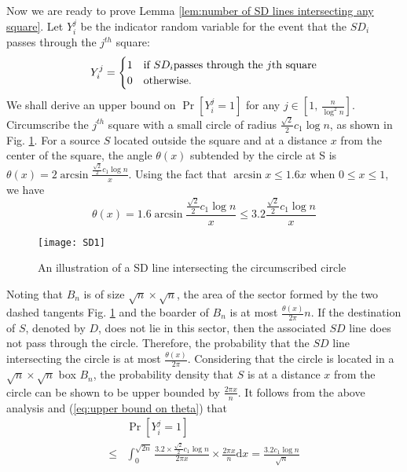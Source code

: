 \documentclass[english]{IEEEtran}
\theoremstyle{plain}
\theoremstyle{plain}
\theoremstyle{plain}
\theoremstyle{remark}
\begin{document}
Now we are ready to prove Lemma \ref{lem:number of SD lines intersecting any square}.
Let $Y_{i}^{j}$ be the indicator random variable for the event that
the $SD_{i}$ passes through the $j^{th}$ square:
\[
Y_{i}^{j}=\begin{cases}
1 & \textrm{if \ensuremath{SD_{i}}passes through the \ensuremath{j}th square}\\
0 & \textrm{otherwise.}
\end{cases}
\]
We shall derive an upper bound on $\Pr\left[Y_{i}^{j}=1\right]$ for
any $j\in\left[1,\,\frac{n}{\log^{2}n}\right]$. Circumscribe the
$j^{th}$ square with a small circle of radius $\frac{\sqrt{2}}{2}c_{1}\log n$,
as shown in Fig. \ref{fig:SD_1}. For a source $S$ located outside
the square and at a distance $x$ from the center of the square, the
angle $\theta\left(x\right)$ subtended by the circle at S is $\theta\left(x\right)=2\arcsin\frac{\frac{\sqrt{2}}{2}c_{1}\log n}{x}$.
Using the fact that $\arcsin x\leq1.6x$ when $0\leq x\leq1$, we
have 
\begin{equation}
\theta\left(x\right)=1.6\arcsin\frac{\frac{\sqrt{2}}{2}c_{1}\log n}{x}\leq3.2\frac{\frac{\sqrt{2}}{2}c_{1}\log n}{x}\label{eq:upper bound on theta}
\end{equation}


\begin{figure}
\begin{centering}
\texttt{[image: SD1]}
\par\end{centering}

\protect\caption{\label{fig:SD_1}An illustration of a SD line intersecting the circumscribed
circle}
\end{figure}


Noting that $B_{n}$ is of size $\sqrt{n}\times\sqrt{n}$, the area
of the sector formed by the two dashed tangents Fig. \ref{fig:SD_1}
and the boarder of $B_{n}$ is at most $\frac{\theta\left(x\right)}{2\pi}n$.
If the destination of $S$, denoted by $D$, does not lie in this
sector, then the associated $SD$ line does not pass through the circle.
Therefore, the probability that the $SD$ line intersecting the circle
is at most $\frac{\theta\left(x\right)}{2\pi}$. Considering that
the circle is located in a $\sqrt{n}\times\sqrt{n}$ box $B_{n}$,
the probability density that $S$ is at a distance $x$ from the circle
can be shown to be upper bounded by $\frac{2\pi x}{n}$. It follows
from the above analysis and (\ref{eq:upper bound on theta}) that
\begin{align}
 & \Pr\left[Y_{i}^{j}=1\right]\nonumber \\
\leq & \int_{0}^{\sqrt{2n}}\frac{3.2\times\frac{\sqrt{2}}{2}c_{1}\log n}{2\pi x}\times\frac{2\pi x}{n}\mathrm{d}x=\frac{3.2c_{1}\log n}{\sqrt{n}}\label{eq:Pr=00005BS-D intersects a square=00005D}
\end{align}
 
\end{document}
